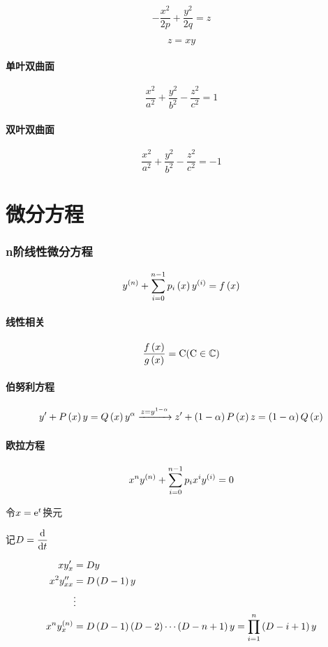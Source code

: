 \documentclass{article}
\begin{document}
\[-\frac{x^2}{2p}+\frac{y^2}{2q}=z\]

\[z=xy\]

\subsection{单叶双曲面}

\[\frac{x^2}{a^2}+\frac{y^2}{b^2}-\frac{z^2}{c^2}=1\]

\subsection{双叶双曲面}

\[\frac{x^2}{a^2}+\frac{y^2}{b^2}-\frac{z^2}{c^2}=-1\]

\part{微分方程}

\section{n阶线性微分方程}

\begin{definition}[]
    \[y^{\left(n\right)}+\sum_{i=0}^{n-1}p_i\left(x\right)y^{\left(i\right)}=f\left(x\right)\label{LinearDifferentialEquationsOfOrderN}\]
\end{definition}

\subsection{线性相关}

\[\frac{f\left(x\right)}{g\left(x\right)}=\mathrm C(\mathrm C\in\mathbb C)\]

\subsection{伯努利方程}

\[y^\prime+P\left(x\right)y=Q\left(x\right)y^\alpha\xrightarrow{z=y^{1-\alpha}} z^\prime+\left(1-\alpha\right)P\left(x\right)z=\left(1-\alpha\right)Q\left(x\right)\]

\subsection{欧拉方程}

\[x^ny^{\left(n\right)}+\sum_{i=0}^{n-1}p_ix^iy^{\left(i\right)}=0\]

令$x=\mathrm e^t$换元

记$D=\dfrac{\mathrm d}{\mathrm d t}$

\[\begin{aligned}
        xy_x^\prime              & =Dy                                                      \\
        x^2y_{xx}^{\prime\prime} & =D\left(D-1\right)y                                               \\
                                 & \vdots                                                   \\
        x^ny_x^{\left(n\right)}           & =D\left(D-1\right)\left(D-2\right)\cdots\left(D-n+1\right)y=\prod_{i=1}^n\left(D-i+1\right)y
    \end{aligned}\]
\end{document}

